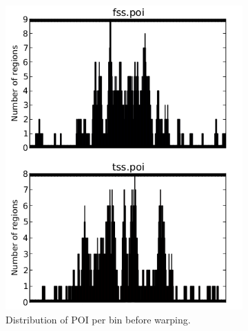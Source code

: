 \documentclass[parskip]{cs4rep}
\begin{document}
\begin{figure}
\begin{subfigure}[b]{0.45\textwidth}
    \end{subfigure}
    ~
    \begin{subfigure}[b]{0.45\textwidth}
        \includegraphics[width=\textwidth]{figures/evaluation/macs-peaks/cluster-35-histogram-clean.png}
        \caption{Distribution of POI per bin before warping.}
        \label{fig:evaluation:macs-peaks:histogram-original}
    \end{subfigure}
    ~
    \begin{subfigure}[b]{0.45\textwidth}

\end{subfigure}
\end{figure}
\end{document}

